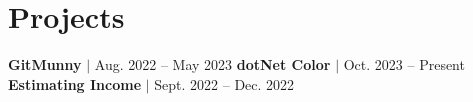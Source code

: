 \section{Projects}
    \resumeSubHeadingListStart
      \resumeProjectHeading
          {\textbf{GitMunny} $|$ \emph{}}{Aug. 2022 -- May 2023}
          \resumeItemListStart
            \resumeItem{}
            \resumeItem{}
            \resumeItem{}
            \resumeItem{}
          \resumeItemListEnd
      \resumeProjectHeading
          {\textbf{dotNet Color} $|$ \emph{}}{Oct. 2023 -- Present}
          \resumeItemListStart
            \resumeItem{}
            \resumeItem{}
            \resumeItem{}
            \resumeItem{}
          \resumeItemListEnd
      \resumeProjectHeading
          {\textbf{Estimating Income} $|$ \emph{}}{Sept. 2022 -- Dec. 2022}
          \resumeItemListStart
          \resumeItem{}
          \resumeItem{}
          \resumeItemListEnd
    \resumeSubHeadingListEnd